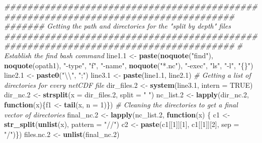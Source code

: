 \documentclass[]{book}
\newenvironment{Shaded}{\begin{snugshade}}{\end{snugshade}}
\newcommand{\CharTok}[1]{\textcolor[rgb]{0.31,0.60,0.02}{#1}}
\newcommand{\CommentTok}[1]{\textcolor[rgb]{0.56,0.35,0.01}{\textit{#1}}}
\newcommand{\ControlFlowTok}[1]{\textcolor[rgb]{0.13,0.29,0.53}{\textbf{#1}}}
\newcommand{\DataTypeTok}[1]{\textcolor[rgb]{0.13,0.29,0.53}{#1}}
\newcommand{\DecValTok}[1]{\textcolor[rgb]{0.00,0.00,0.81}{#1}}
\newcommand{\FloatTok}[1]{\textcolor[rgb]{0.00,0.00,0.81}{#1}}
\newcommand{\KeywordTok}[1]{\textcolor[rgb]{0.13,0.29,0.53}{\textbf{#1}}}
\newcommand{\NormalTok}[1]{#1}
\newcommand{\OtherTok}[1]{\textcolor[rgb]{0.56,0.35,0.01}{#1}}
\newcommand{\StringTok}[1]{\textcolor[rgb]{0.31,0.60,0.02}{#1}}
\begin{document}
\begin{Shaded}
\begin{Highlighting}[]
{{\CommentTok{####################################################################################}
\CommentTok{####### Getting the path and directories for the "split by depth" files}
\CommentTok{####################################################################################}
  \CommentTok{# Establish the find bash command}
\NormalTok{    line1}\FloatTok{.1}\NormalTok{ <-}\StringTok{ }\KeywordTok{paste}\NormalTok{(}\KeywordTok{noquote}\NormalTok{(}\StringTok{"find"}\NormalTok{), }\KeywordTok{noquote}\NormalTok{(opath1), }\StringTok{"-type"}\NormalTok{, }\StringTok{"f"}\NormalTok{, }\StringTok{"-name"}\NormalTok{, }
                     \KeywordTok{noquote}\NormalTok{(}\StringTok{"*.nc"}\NormalTok{), }\StringTok{"-exec"}\NormalTok{, }\StringTok{"ls"}\NormalTok{, }\StringTok{"-l"}\NormalTok{, }\StringTok{"\{\}"}\NormalTok{)}
\NormalTok{    line2}\FloatTok{.1}\NormalTok{ <-}\StringTok{ }\KeywordTok{paste0}\NormalTok{(}\StringTok{"}\CharTok{\textbackslash{}\textbackslash{}}\StringTok{"}\NormalTok{, }\StringTok{";"}\NormalTok{)}
\NormalTok{    line3}\FloatTok{.1}\NormalTok{ <-}\StringTok{ }\KeywordTok{paste}\NormalTok{(line1}\FloatTok{.1}\NormalTok{, line2}\FloatTok{.1}\NormalTok{)}
  \CommentTok{# Getting a list of directories for every netCDF file}
\NormalTok{    dir_files}\FloatTok{.2}\NormalTok{ <-}\StringTok{ }\KeywordTok{system}\NormalTok{(line3}\FloatTok{.1}\NormalTok{, }\DataTypeTok{intern =} \OtherTok{TRUE}\NormalTok{)}
\NormalTok{    dir_nc}\FloatTok{.2}\NormalTok{ <-}\StringTok{ }\KeywordTok{strsplit}\NormalTok{(}\DataTypeTok{x =}\NormalTok{ dir_files}\FloatTok{.2}\NormalTok{, }\DataTypeTok{split =} \StringTok{" "}\NormalTok{)}
\NormalTok{    nc_list}\FloatTok{.2}\NormalTok{ <-}\StringTok{ }\KeywordTok{lapply}\NormalTok{(dir_nc}\FloatTok{.2}\NormalTok{, }\ControlFlowTok{function}\NormalTok{(x)\{f1 <-}\StringTok{ }\KeywordTok{tail}\NormalTok{(x, }\DataTypeTok{n =} \DecValTok{1}\NormalTok{)\})}
  \CommentTok{# Cleaning the directories to get a final vector of directories}
\NormalTok{    final_nc}\FloatTok{.2}\NormalTok{ <-}\StringTok{ }\KeywordTok{lapply}\NormalTok{(nc_list}\FloatTok{.2}\NormalTok{, }\ControlFlowTok{function}\NormalTok{(x) \{}
\NormalTok{      c1 <-}\StringTok{ }\KeywordTok{str_split}\NormalTok{(}\KeywordTok{unlist}\NormalTok{(x), }\DataTypeTok{pattern =} \StringTok{"//"}\NormalTok{)}
\NormalTok{      c2 <-}\StringTok{ }\KeywordTok{paste}\NormalTok{(c1[[}\DecValTok{1}\NormalTok{]][}\DecValTok{1}\NormalTok{], c1[[}\DecValTok{1}\NormalTok{]][}\DecValTok{2}\NormalTok{], }\DataTypeTok{sep =} \StringTok{"/"}\NormalTok{)\})}
\NormalTok{    files.nc}\FloatTok{.2}\NormalTok{ <-}\StringTok{ }\KeywordTok{unlist}\NormalTok{(final_nc}\FloatTok{.2}\NormalTok{)}
    
}}
\end{Highlighting}
\end{Shaded}
\end{document}
